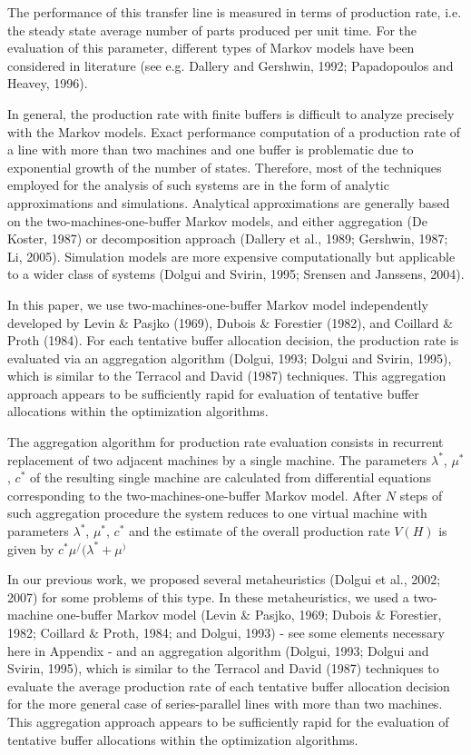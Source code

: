 \documentclass{ifacconf}
\begin{document}
The performance of this transfer line is measured in terms of production rate, i.e. the 
steady state average number of parts produced per unit time. For the evaluation of this
parameter, different types of Markov models have been considered in literature (see e.g. 
Dallery and Gershwin, 1992; Papadopoulos and Heavey, 1996). 
 
In general, the production rate with finite buffers is difficult to analyze precisely with 
the Markov models. Exact performance computation of a production rate of a line with 
more than two machines and one buffer is problematic due to exponential growth of the 
number of states. Therefore, most of the techniques employed for the analysis of such 
systems are in the form of analytic approximations and simulations. Analytical 
approximations are generally based on the two-machines-one-buffer Markov models, 
and either aggregation (De Koster, 1987) or decomposition approach (Dallery et al., 
1989; Gershwin, 1987; Li, 2005). Simulation models are more expensive 
computationally but applicable to a wider class of systems (Dolgui and Svirin, 1995; 
Srensen and Janssens, 2004). 
 
In this paper, we use two-machines-one-buffer Markov model independently developed 
by Levin $\&$ Pasjko (1969), Dubois $\&$ Forestier (1982), and Coillard $\&$ Proth (1984). For 
each tentative buffer allocation decision, the production rate is evaluated via an 
aggregation algorithm (Dolgui, 1993; Dolgui and Svirin, 1995), which is similar to the 
Terracol and David (1987) techniques. This aggregation approach appears to be 
sufficiently rapid for evaluation of tentative buffer allocations within the optimization 
algorithms.  
 
The aggregation algorithm for production rate evaluation consists in recurrent 
replacement of two adjacent machines by a single machine. The parameters $\lambda^*$, $\mu^*$, $c^*$ of 
the resulting single machine are calculated from differential equations corresponding to
the two-machines-one-buffer Markov model. After $N$ steps of such aggregation 
procedure the system reduces to one virtual machine with parameters $\lambda^*$, $\mu^*$, $c^*$ and the 
estimate of the overall production rate $V(H)$ is given by $c^*\mu^/(\lambda^*+\mu^)$


In our previous work, we proposed several metaheuristics (Dolgui et al., 2002; 2007) for 
some problems of this type. In these metaheuristics, we used a two-machine one-buffer 
Markov  model  (Levin  $\&$  Pasjko,  1969;  Dubois  $\&$  Forestier,  1982;  Coillard  $\&$  Proth, 
1984;  and  Dolgui,  1993)  -  see  some  elements  necessary  here  in  Appendix  -  and  an 
aggregation algorithm (Dolgui, 1993; Dolgui and Svirin, 1995), which is similar to the 
Terracol and David (1987) techniques to evaluate the average production rate of each 
tentative buffer allocation decision for the more general case of series-parallel lines with 
more than two machines. This aggregation approach appears to be sufficiently rapid for 
the evaluation of tentative buffer allocations within the optimization algorithms. 
\end{document}
